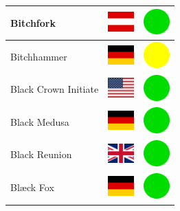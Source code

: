 \documentclass[12pt, a4paper, twoside]{report}
\begin{document}
\begin{center}
\begin{longtable}{|p{5cm}|p{2cm}|p{2cm}|}
Bitchfork & \includegraphics[width=1cm]{4x3/at} & \includegraphics[width=1cm]{likes/y} \\ \hline
Bitchhammer & \includegraphics[width=1cm]{4x3/de} & \includegraphics[width=1cm]{likes/m} \\ \hline
Black Crown Initiate & \includegraphics[width=1cm]{4x3/us} & \includegraphics[width=1cm]{likes/y} \\ \hline
Black Medusa & \includegraphics[width=1cm]{4x3/de} & \includegraphics[width=1cm]{likes/y} \\ \hline
Black Reunion & \includegraphics[width=1cm]{4x3/gb} & \includegraphics[width=1cm]{likes/y} \\ \hline
Blæck Fox & \includegraphics[width=1cm]{4x3/de} & \includegraphics[width=1cm]{likes/y} \\ \hline

\end{longtable}
\end{center}
\end{document}
